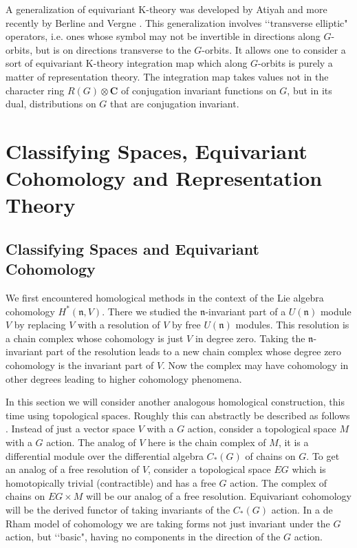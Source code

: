 \documentclass[a4paper,a4paper]{article}
\theoremstyle{conjecture}
\begin{document}
A generalization of equivariant K-theory was developed by Atiyah \cite{Atiyah2} and
more recently by Berline and Vergne \cite{BV1,BV2}.  
This generalization involves \lq\lq transverse elliptic" operators, i.e. ones whose symbol
may not be invertible in directions along $G$-orbits, but is on directions transverse to
the $G$-orbits.  It allows one to consider a sort of equivariant K-theory integration map
which along $G$-orbits is purely a matter of representation theory.
The integration map takes values not in the character ring $R(G)\otimes \mathbf C$
of conjugation invariant functions on $G$, but in its dual, distributions on $G$ that
are conjugation invariant.


\section{Classifying Spaces, Equivariant Cohomology and Representation Theory}

\subsection{Classifying Spaces and Equivariant Cohomology}

We first encountered homological methods in the context of the Lie
algebra cohomology $H^*(\mathfrak n, V)$.  There we studied the 
$\mathfrak n$-invariant part of a $U(\mathfrak n)$ module $V$ by
replacing $V$ with a resolution of $V$ by free $U(\mathfrak n)$   
modules.  This resolution is a chain complex whose cohomology is  
just $V$ in degree zero.  Taking the $\mathfrak n$-invariant part
of the resolution leads to a new chain complex whose degree zero 
cohomology is the invariant part of $V$. Now the complex may have
cohomology in other degrees leading to higher cohomology
phenomena.

In this section we will consider another analogous homological construction,
this time using topological spaces.             
Roughly this can abstractly be described as follows \cite{Moore}.
Instead of just a
vector space $V$ with a $G$ action, consider a topological space
$M$ with a $G$ action. The analog of $V$ here is the chain complex
of $M$, it is a differential module over the differential algebra  
$C_*(G)$ of chains on $G$. To get an analog of a free resolution
of $V$, consider a topological space $EG$ which is homotopically
trivial (contractible) and has a free $G$ action.  The complex of 
chains on $EG\times M$ will be our analog of a free resolution.
Equivariant cohomology will be the derived functor of taking
invariants of the $C_*(G)$ action.  In a de Rham model of cohomology we
are taking forms not just invariant under the $G$ action, but \lq\lq basic",
having no components in the direction of the  $G$ action.
\end{document}

